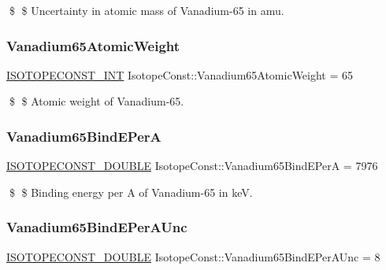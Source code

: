 \$ \$ Uncertainty in atomic mass of Vanadium-\/65 in amu. \mbox{\label{group___isotope_const-_vanadium-_v65_ga189df2ef80cf5ccba6736092bb1f7b82}} 
\subsubsection{\texorpdfstring{Vanadium65\+Atomic\+Weight}{Vanadium65AtomicWeight}}
{\footnotesize\ttfamily \mbox{\hyperlink{group___isotope_const-_macros_ga5f18360b3e99483a35c32d789e62621c}{I\+S\+O\+T\+O\+P\+E\+C\+O\+N\+S\+T\+\_\+\+I\+NT}} Isotope\+Const\+::\+Vanadium65\+Atomic\+Weight = 65}

\$ \$ Atomic weight of Vanadium-\/65. \mbox{\label{group___isotope_const-_vanadium-_v65_gad388f0704fa92758c4aea38af311f61c}} 
\subsubsection{\texorpdfstring{Vanadium65\+Bind\+E\+PerA}{Vanadium65BindEPerA}}
{\footnotesize\ttfamily \mbox{\hyperlink{group___isotope_const-_macros_ga8f45a7272ce02c0b4c65c44636ed719a}{I\+S\+O\+T\+O\+P\+E\+C\+O\+N\+S\+T\+\_\+\+D\+O\+U\+B\+LE}} Isotope\+Const\+::\+Vanadium65\+Bind\+E\+PerA = 7976}

\$ \$ Binding energy per A of Vanadium-\/65 in keV. \mbox{\label{group___isotope_const-_vanadium-_v65_ga41e5c5157b5910274605b81463183f7d}} 
\subsubsection{\texorpdfstring{Vanadium65\+Bind\+E\+Per\+A\+Unc}{Vanadium65BindEPerAUnc}}
{\footnotesize\ttfamily \mbox{\hyperlink{group___isotope_const-_macros_ga8f45a7272ce02c0b4c65c44636ed719a}{I\+S\+O\+T\+O\+P\+E\+C\+O\+N\+S\+T\+\_\+\+D\+O\+U\+B\+LE}} Isotope\+Const\+::\+Vanadium65\+Bind\+E\+Per\+A\+Unc = 8}

